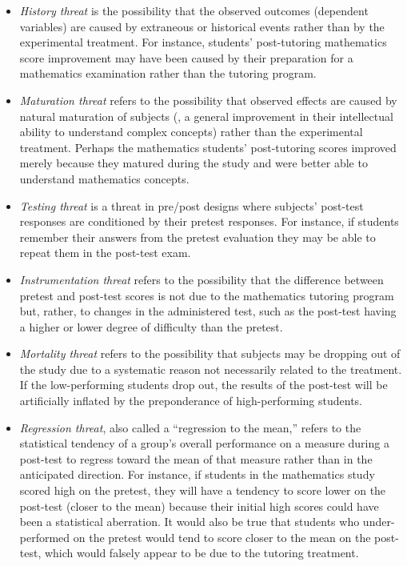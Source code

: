 \begin{itemize}
	\item \textit{History threat} is the possibility that the observed outcomes (dependent variables) are caused by extraneous or historical events rather than by the experimental treatment. For instance, students' post-tutoring mathematics score improvement may have been caused by their preparation for a mathematics examination rather than the tutoring program.

	\item \textit{Maturation threat} refers to the possibility that observed effects are caused by natural maturation of subjects (\eg, a general improvement in their intellectual ability to understand complex concepts) rather than the experimental treatment. Perhaps the mathematics students' post-tutoring scores improved merely because they matured during the study and were better able to understand mathematics concepts.

	\item \textit{Testing threat} is a threat in pre/post designs where subjects' post-test responses are conditioned by their pretest responses. For instance, if students remember their answers from the pretest evaluation they may be able to repeat them in the post-test exam.

	\item \textit{Instrumentation threat} refers to the possibility that the difference between pretest and post-test scores is not due to the mathematics tutoring program but, rather, to changes in the administered test, such as the post-test having a higher or lower degree of difficulty than the pretest.

	\item \textit{Mortality threat} refers to the possibility that subjects may be dropping out of the study due to a systematic reason not necessarily related to the treatment. If the low-performing students drop out, the results of the post-test will be artificially inflated by the preponderance of high-performing students.

	\item \textit{Regression threat}, also called a ``regression to the mean,'' refers to the statistical tendency of a group's overall performance on a measure during a post-test to regress toward the mean of that measure rather than in the anticipated direction. For instance, if students in the mathematics study scored high on the pretest, they will have a tendency to score lower on the post-test (closer to the mean) because their initial high scores could have been a statistical aberration. It would also be true that students who under-performed on the pretest would tend to score closer to the mean on the post-test, which would falsely appear to be due to the tutoring treatment.
\end{itemize}


